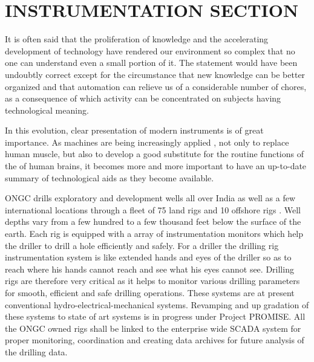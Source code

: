 \chapter{INSTRUMENTATION SECTION}

\onehalfspacing

It is often said that the proliferation of knowledge and the accelerating development of technology 
have rendered our environment so complex that no one can understand even a small portion of it. 
The statement would have been undoubtly correct except for the circumstance that new knowledge can 
be better organized and that automation can relieve us of a considerable number of chores, as a
consequence of which activity can be concentrated on subjects having technological meaning. 

\vspace{1em}

In this evolution, clear presentation of modern instruments is of great importance. As machines are
being increasingly applied , not only to replace human muscle, but also to develop a good substitute 
for the routine functions of the of human brains, it becomes more and more important to have an 
up-to-date summary of technological aids as they become available.

\vspace{1em}

ONGC drills exploratory and development wells all over India as well as a few international 
locations through a fleet of 75 land rigs and 10 offshore rigs . Well depths vary from a few 
hundred to a few thousand feet below the surface of the earth. Each rig is equipped with a array 
of instrumentation monitors which help the driller to drill a hole efficiently and safely. 
For a driller the drilling rig instrumentation system is like extended hands and eyes of the driller 
so as to reach where his hands cannot reach and see what his eyes cannot see. Drilling rigs are 
therefore very critical as it helps to monitor various drilling parameters for smooth,
efficient and safe drilling operations. These systems are at present conventional
hydro-electrical-mechanical systems. Revamping and up gradation of these systems to state of art 
systems is in progress under Project PROMISE. All the ONGC owned rigs shall be linked to 
the enterprise wide SCADA system for proper monitoring, coordination and creating data archives 
for future analysis of the drilling data.


\vspace{1em}

